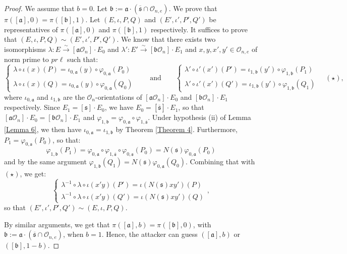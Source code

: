 \documentclass[a4paper,10pt,notitlepage]{report}
\theoremstyle{definition}
\theoremstyle{plain}
\theoremstyle{definition}
\newcommand{\mO}{\mathcal{O}}
\renewcommand{\(}{\left(}
\renewcommand{\)}{\right)}
\newcommand{\mf}[1]{\mathfrak{#1}}
\begin{document}
\begin{proof}
We assume that $b=0$. Let $\mf{b}:=\mf{a}\cdot (\overline{\mf{s}}\cap\mO_{n,e})$. We prove that $\pi([\mf{a}],0)=\pi([\mf{b}],1)$. Let $(E,\iota, P,Q)$ and $(E',\iota',P',Q')$ be representatives of $\pi([\mf{a}],0)$ and $\pi([\mf{b}],1)$ respectively. It suffices to prove that $(E,\iota, P,Q)\sim(E',\iota',P',Q')$.  We know that there exists two isomorphisms $\lambda : E\overset{\sim}{\longrightarrow} [\mf{a}\mO_n]\cdot E_0$ and $\lambda' : E'\overset{\sim}{\longrightarrow} [\mf{b}\mO_n]\cdot E_1$ and $x, y, x',y'\in\mO_{n,e}$ of norm prime to $pr\ell$ such that:
\[\left\{\begin{array}{c}
\lambda\circ\iota(x)(P)=\iota_{0,\mf{a}}(y)\circ\varphi_{0,\mf{a}}(P_0)\\
\lambda\circ\iota(x)(Q)=\iota_{0,\mf{a}}(y)\circ\varphi_{0,\mf{a}}(Q_0)
\end{array}\right.\qquad \mbox{and}\qquad \left\{\begin{array}{c}
\lambda'\circ\iota'(x')(P')=\iota_{1,\mf{b}}(y')\circ\varphi_{1,\mf{b}}(P_1)\\
\lambda'\circ\iota'(x')(Q')=\iota_{1,\mf{b}}(y')\circ\varphi_{1,\mf{b}}(Q_1)
\end{array}\right.\quad (\star),\]
where $\iota_{0,\mf{a}}$ and $\iota_{1,\mf{b}}$ are the $\mO_n$-orientations of $[\mf{a}\mO_n]\cdot E_0$ and $[\mf{b}\mO_n]\cdot E_1$ respectively. Since $E_1=[\mf{s}]\cdot E_0$, we have $E_0=[\overline{\mf{s}}]\cdot E_1$, so that $[\mf{a}\mO_n]\cdot E_0=[\mf{b}\mO_n]\cdot E_1$ and $\varphi_{1,\mf{b}}=\varphi_{0,\mf{a}}\circ\varphi_{1,\overline{\mf{s}}}$.  Under hypothesis (ii) of Lemma \ref{Lemma 6}, we then have $\iota_{0,\mf{a}}=\iota_{1,\mf{b}}$ by Theorem \ref{Theorem 4}.  Furthermore, $P_1=\varphi_{0,\mf{s}}(P_0)$, so that:
\[\varphi_{1,\mf{b}}(P_1)=\varphi_{0,\mf{a}}\circ\varphi_{1,\overline{\mf{s}}}\circ\varphi_{0,\mf{s}}(P_0)=N(\mf{s})\varphi_{0,\mf{a}}(P_0)\]
and by the same argument $\varphi_{1,\mf{b}}(Q_1)=N(\mf{s})\varphi_{0,\mf{a}}(Q_0)$.  Combining that with $(\star)$, we get:
\[\left\{\begin{array}{c}
\lambda^{-1}\circ\lambda\circ\iota(x'y)(P')=\iota(N(\mf{s})xy')(P)\\
\lambda^{-1}\circ\lambda\circ\iota(x'y)(Q')=\iota(N(\mf{s})xy')(Q)
\end{array}\right.,\]
so that $(E',\iota',P',Q')\sim (E,\iota, P,Q)$.

By similar arguments, we get that $\pi([\mf{a}],b)=\pi([\mf{b}],0)$, with $\mf{b}:=\mf{a}\cdot(\overline{\mf{s}}\cap\mO_{n,e})$, when $b=1$. Hence, the attacker can guess $([\mf{a}],b)$ or $([\mf{b}],1-b)$.


\end{proof}
\end{document}
